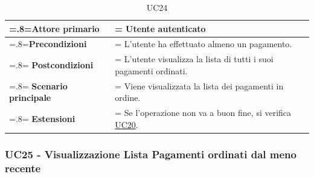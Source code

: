                 \begin{table}[H]
                    \centering
                    \renewcommand{\arraystretch}{1.8}
                    \renewcommand\tabularxcolumn[1]{m{#1}}
                    \begin{tabularx}{0.9\textwidth} {
                        >{\hsize=.8\hsize\linewidth=\hsize}X
                        >{\hsize=1.2\hsize\linewidth=\hsize}X}
                        \hline
                        \textbf{Attore primario} & Utente autenticato \\
                        \hline
                        \textbf{Precondizioni} & L'utente ha effettuato almeno un pagamento. \\
                        \hline
                        \textbf{Postcondizioni} & L'utente visualizza la lista di tutti i suoi pagamenti ordinati. \\
                        \hline
                        \textbf{Scenario principale} & Viene visualizzata la lista dei pagamenti in ordine. \\
                        \hline
                        \textbf{Estensioni} & Se l'operazione non va a buon fine, si verifica \hyperref[UC20]{UC20}. \\
                        \hline
                    \end{tabularx}
                    \caption{UC24}
                \end{table}


            \subsubsection{UC25 - Visualizzazione Lista Pagamenti ordinati dal meno recente}
            \label{UC25}


